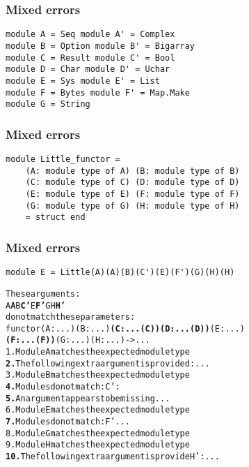 \documentclass[a4paper,11pt]{beamer}
\begin{document}
\begin{frame}[fragile]\frametitle{Mixed errors}
\begin{verbatim}
module A = Seq module A' = Complex
module B = Option module B' = Bigarray
module C = Result module C' = Bool
module D = Char module D' = Uchar
module E = Sys module E' = List
module F = Bytes module F' = Map.Make
module G = String
\end{verbatim}
\end{frame}
\begin{frame}[fragile]\frametitle{Mixed errors}
\begin{verbatim}
module Little_functor =
    (A: module type of A) (B: module type of B)
    (C: module type of C) (D: module type of D)
    (E: module type of E) (F: module type of F)
    (G: module type of G) (H: module type of H)
    = struct end
\end{verbatim}
\end{frame}

\begin{frame}[fragile]\frametitle{Mixed errors}
\begin{verbatim}
module E = Little(A)(A)(B)(C')(E)(F')(G)(H)(H)
\end{verbatim}
\begin{alltt}
These arguments:
  {\color{green}{}A} {\color{red}{}\bfseries{}A} {\color{green}{}B} {\color{magenta}{}\bfseries{}C'} {\color{red}{}\bfseries{}} {\color{green}{}E} {\color{magenta}{}\bfseries{}F'} {\color{green}{}G} {\color{green}{}H} {\color{red}{}\bfseries{}H'}
do not match these parameters:
  functor {\color{green}{}(A : ...)} {\color{red}{}\bfseries{}} {\color{green}{}(B : ...)} {\color{magenta}{}\bfseries{}(C : ...(C))} {\color{red}{}\bfseries{}(D : ...(D))} {\color{green}{}(E : ...)}
  {\color{magenta}{}\bfseries{}(F : ...(F))} {\color{green}{}(G : ...)} {\color{green}{}(H : ...)} {\color{red}{}\bfseries{}} -> ...
{\color{green}{}1.} Module A matches the expected module type
{\color{red}{}\bfseries{}2.} The following extra argument is provided: ...
{\color{green}{}3.} Module B matches the expected module type
{\color{magenta}{}\bfseries{}4.} Modules do not match: C' :
{\color{red}{}\bfseries{}5.} An argument appears to be missing ...
{\color{green}{}6.} Module E matches the expected module type
{\color{magenta}{}\bfseries{}7.} Modules do not match: F' ...
{\color{green}{}8.} Module G matches the expected module type
{\color{green}{}9.} Module H matches the expected module type
{\color{red}{}\bfseries{}10.} The following extra argument is provide H' : ...
\end{alltt}
\end{frame}
\end{document}
